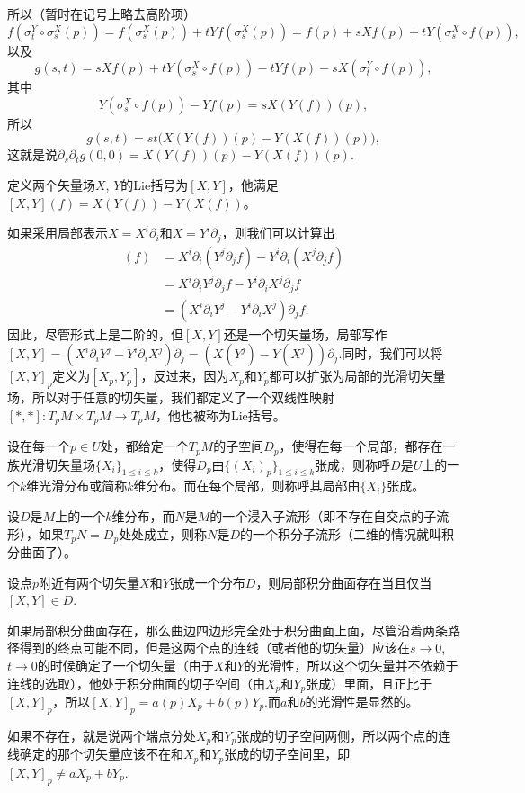 所以（暂时在记号上略去高阶项）
\[
	f(\sigma^Y_t\circ\sigma^X_s(p))=f(\sigma^X_s(p))+tYf(\sigma^X_s(p))=f(p)+sXf(p)+tY(\sigma^X_s\circ f(p)),
\]
以及
\[
	g(s,t)=sXf(p)+tY(\sigma^X_s\circ f(p))-tYf(p)-sX(\sigma^Y_t\circ f(p)),
\]
其中
\[
	Y(\sigma^X_s\circ f(p))-Yf(p)=sX(Y(f))(p),
\]
所以
\[
	g(s,t)=st\bigl(X(Y(f))(p)-Y(X(f))(p)\bigr),
\]
这就是说$\partial_s\partial_t g(0,0)=X(Y(f))(p)-Y(X(f))(p)$.

\para 定义两个矢量场$X$, $Y$的Lie括号为$[X,Y]$，他满足$[X,Y](f)=X(Y(f))-Y(X(f))$。

如果采用局部表示$X=X^i\partial_i$和$X=Y^i\partial_j$，则我们可以计算出
\begin{align*}
	[X,Y](f)&=X^i\partial_i(Y^j\partial_j f)-Y^i\partial_i(X^j\partial_j f)\\
	&=X^i\partial_iY^j\partial_j f-Y^i\partial_i X^j\partial_j f\\
	&=(X^i\partial_iY^j-Y^i\partial_i X^j)\partial_jf.
\end{align*}
因此，尽管形式上是二阶的，但$[X,Y]$还是一个切矢量场，局部写作$[X,Y]=(X^i\partial_iY^j-Y^i\partial_i X^j)\partial_j=(X(Y^j)-Y(X^j))\partial_j$.同时，我们可以将$[X,Y]_p$定义为$[X_p,Y_p]$，反过来，因为$X_p$和$Y_p$都可以扩张为局部的光滑切矢量场，所以对于任意的切矢量，我们都定义了一个双线性映射$[*,*]:T_pM\times T_pM\to T_pM$，他也被称为Lie括号。

\para 设在每一个$p\in U$处，都给定一个$T_pM$的子空间$D_p$，使得在每一个局部，都存在一族光滑切矢量场$\{X_i\}_{1\leq i\leq k}$，使得$D_p$由$\{(X_i)_p\}_{1\leq i\leq k}$张成，则称呼$D$是$U$上的一个$k$维光滑分布或简称$k$维分布。而在每个局部，则称呼其局部由$\{X_i\}$张成。

设$D$是$M$上的一个$k$维分布，而$N$是$M$的一个浸入子流形（即不存在自交点的子流形），如果$T_pN=D_p$处处成立，则称$N$是$D$的一个积分子流形（二维的情况就叫积分曲面了）。

\para 设点$p$附近有两个切矢量$X$和$Y$张成一个分布$D$，则局部积分曲面存在当且仅当$[X,Y]\in D$.

如果局部积分曲面存在，那么曲边四边形完全处于积分曲面上面，尽管沿着两条路径得到的终点可能不同，但是这两个点的连线（或者他的切矢量）应该在$s\to 0$, $t\to 0$的时候确定了一个切矢量（由于$X$和$Y$的光滑性，所以这个切矢量并不依赖于连线的选取），他处于积分曲面的切子空间（由$X_p$和$Y_p$张成）里面，且正比于$[X,Y]_p$，所以$[X,Y]_p=a(p)X_p+b(p)Y_p$.而$a$和$b$的光滑性是显然的。

如果不存在，就是说两个端点分处$X_p$和$Y_p$张成的切子空间两侧，所以两个点的连线确定的那个切矢量应该不在和$X_p$和$Y_p$张成的切子空间里，即$[X,Y]_p\neq aX_p+bY_p$.

